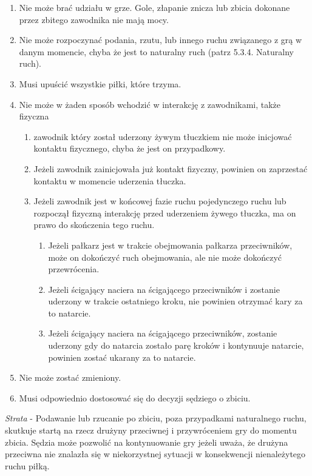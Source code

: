 \documentclass[12pt]{article}
\begin{document}
\begin{enumerate}
\item
    Nie może brać udziału w grze. Gole, złapanie znicza lub zbicia
  dokonane przez zbitego zawodnika nie mają mocy.
  \item
  Nie może rozpoczynać podania, rzutu, lub innego ruchu związanego z grą
  w danym momencie, chyba że jest to naturalny ruch (patrz 5.3.4.
  Naturalny ruch).
\item
  Musi upuścić wszystkie piłki, które trzyma.
\item
  Nie może w żaden sposób wchodzić w interakcję z zawodnikami, także
  fizyczna

  \begin{enumerate}
  \item
        zawodnik który został uderzony żywym tłuczkiem nie może inicjować
    kontaktu fizycznego, chyba że jest on przypadkowy.
      \item
        Jeżeli zawodnik zainicjowała już kontakt fizyczny, powinien on
    zaprzestać kontaktu w momencie uderzenia tłuczka.
      \item
        Jeżeli zawodnik jest w końcowej fazie ruchu pojedynczego ruchu lub
    rozpoczął fizyczną interakcję przed uderzeniem żywego tłuczka, ma on
    prawo do skończenia tego ruchu.
    
    \begin{enumerate}
    \item
            Jeżeli pałkarz jest w trakcie obejmowania pałkarza przeciwników,
      może on dokończyć ruch obejmowania, ale nie może dokończyć
      przewrócenia.
          \item
            Jeżeli ścigający naciera na ścigającego przeciwników i zostanie
      uderzony w trakcie ostatniego kroku, nie powinien otrzymać kary za
      to natarcie.
          \item
            Jeżeli ścigający naciera na ścigającego przeciwników, zostanie
      uderzony gdy do natarcia zostało parę kroków i kontynuuje
      natarcie, powinien zostać ukarany za to natarcie.
          \end{enumerate}
  \end{enumerate}
\item
    Nie może zostać zmieniony.
  \item
    Musi odpowiednio dostosować się do decyzji sędziego o zbiciu.
  \end{enumerate}

\emph{Strata} - Podawanie lub rzucanie po zbiciu, poza przypadkami
naturalnego ruchu, skutkuje startą na rzecz drużyny przeciwnej i
przywróceniem gry do momentu zbicia. Sędzia może pozwolić na
kontynuowanie gry jeżeli uważa, że drużyna przeciwna nie znalazła się w
niekorzystnej sytuacji w konsekwencji nienależytego ruchu piłką.
\end{document}
